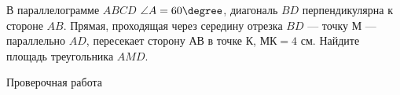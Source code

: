 \begin{class}[number=7]
	\begin{listofex}
		\item В параллелограмме \( ABCD \) \( \angle A = 60\degree \), диагональ \( BD \) перпендикулярна к стороне \( AB \). Прямая, проходящая через середину отрезка \( BD \) --- точку \( М \) --- параллельно \( AD \), пересекает сторону \( АВ \) в точке \( К \), \( МК = 4 \) см. Найдите площадь треугольника \( AMD \).
	\end{listofex}
\end{class}

\begin{exam}
	\begin{listofex}
		\item Проверочная работа
	\end{listofex}
\end{exam}
